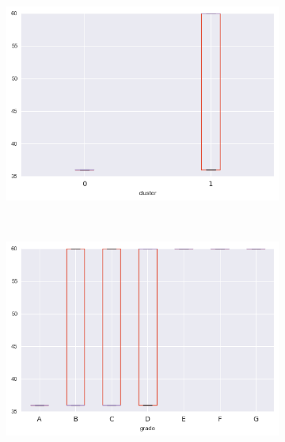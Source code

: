 \begin{anexosenv}
\begin{figure}[t!]
\begin{subfigure}[t]{0.5\textwidth}
            \centerline{\includegraphics[width=1\textwidth]{img/term_float_by_cluster}}
        \end{subfigure}%
        ~ 
        \begin{subfigure}[t]{0.5\textwidth}
            \centering
   
            \centerline{\includegraphics[width=1\textwidth]{img/term_float_by_grade}}

        \end{subfigure}
        \\
                \caption{loan\textunderscore amnt}
        \begin{subfigure}[t]{0.5\textwidth}
            \centering


\end{subfigure}
\end{figure}
\end{anexosenv}

